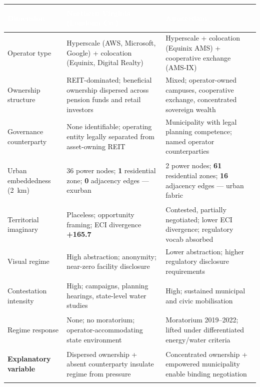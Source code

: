\bigskip
\begin{fullwidth}
\footnotesize
{}
\setlength{\tabcolsep}{4pt}
\renewcommand{\arraystretch}{1.0}
\begin{tabularx}{\linewidth}{>{\bfseries\raggedright}p{2.8cm}XX}
\toprule
\rowcolor{dcblue}
\textcolor{white}{\textbf{Dimension}} &
\textcolor{white}{\textbf{Northern Virginia (Loudoun Co.)}} &
\textcolor{white}{\textbf{Amsterdam}} \\
\midrule
Operator type &
  Hyperscale (AWS, Microsoft, Google) + colocation (Equinix, Digital Realty) &
  Hyperscale + colocation (Equinix AMS) + cooperative exchange (AMS-IX) \\
\rowcolor{dcgray}
Ownership structure &
  REIT-dominated; beneficial ownership dispersed across pension funds and retail investors &
  Mixed; operator-owned campuses, cooperative exchange, concentrated sovereign wealth \\
Governance counterparty &
  None identifiable; operating entity legally separated from asset-owning REIT &
  Municipality with legal planning competence; named operator counterparties \\
\rowcolor{dcgray}
Urban embeddedness (2~km) &
  36 power nodes; \textbf{1} residential zone; \textbf{0} adjacency edges --- exurban &
  2 power nodes; \textbf{61} residential zones; \textbf{16} adjacency edges --- urban fabric \\
Territorial imaginary &
  Placeless; opportunity framing; ECI divergence \textbf{+165.7} &
  Contested, partially negotiated; lower ECI divergence; regulatory vocab absorbed \\
\rowcolor{dcgray}
Visual regime &
  High abstraction; anonymity; near-zero facility disclosure &
  Lower abstraction; higher regulatory disclosure requirements \\
Contestation intensity &
  High; campaigns, planning hearings, state-level water studies &
  High; sustained municipal and civic mobilisation \\
\rowcolor{dcgray}
Regime response &
  None; no moratorium; operator-accommodating state environment &
  Moratorium 2019--2022; lifted under differentiated energy/water criteria \\
\rowcolor{dclightyellow}
\textcolor{dcaccent}{\textbf{Explanatory variable}} &
  \textcolor{dcaccent}{Dispersed ownership + absent counterparty insulate regime from pressure} &
  \textcolor{dcblue}{Concentrated ownership + empowered municipality enable binding negotiation} \\
\bottomrule
\end{tabularx}
\end{fullwidth}
\bigskip
